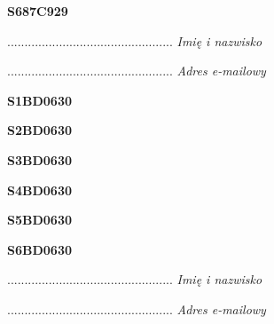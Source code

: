 \begin{turn}{90}\huge \textbf{S687C929}\end{turn}

\begin{turn}{90}\begin{minipage}{\linewidth} \vspace{20mm} ................................................  \textit{Imię i nazwisko}\end{minipage}\end{turn}

\begin{turn}{90}\begin{minipage}{\linewidth} \vspace{20mm} ................................................  \textit{Adres e-mailowy}\end{minipage}\end{turn}

\begin{turn}{90}\huge \textbf{S1BD0630}\end{turn}

\begin{turn}{90}\huge \textbf{S2BD0630}\end{turn}

\begin{turn}{90}\huge \textbf{S3BD0630}\end{turn}

\begin{turn}{90}\huge \textbf{S4BD0630}\end{turn}

\begin{turn}{90}\huge \textbf{S5BD0630}\end{turn}

\begin{turn}{90}\huge \textbf{S6BD0630}\end{turn}

\begin{turn}{90}\begin{minipage}{\linewidth} \vspace{20mm} ................................................  \textit{Imię i nazwisko}\end{minipage}\end{turn}

\begin{turn}{90}\begin{minipage}{\linewidth} \vspace{20mm} ................................................  \textit{Adres e-mailowy}\end{minipage}\end{turn}

